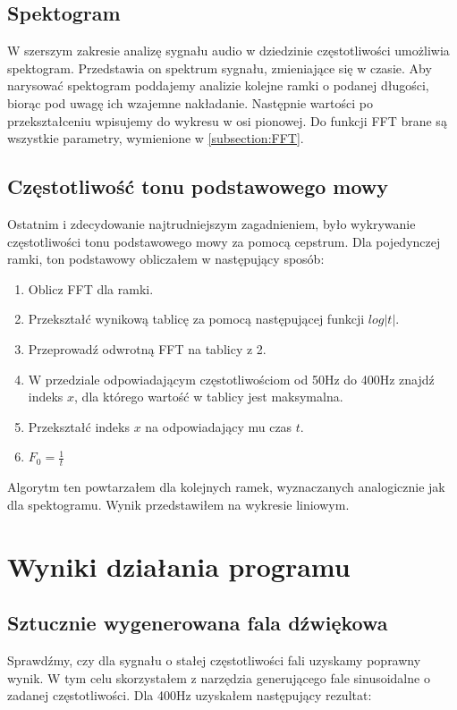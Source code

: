 \documentclass{article}
\begin{document}
\subsection{Spektogram}

W szerszym zakresie analizę sygnału audio w dziedzinie częstotliwości umożliwia spektogram. Przedstawia on spektrum sygnału, zmieniające się w czasie. Aby narysować spektogram poddajemy analizie kolejne ramki o podanej długości, biorąc pod uwagę ich wzajemne nakładanie. Następnie wartości po przekształceniu wpisujemy do wykresu w osi pionowej. Do funkcji FFT brane są wszystkie parametry, wymienione w \ref{subsection:FFT}.

\subsection{Częstotliwość tonu podstawowego mowy}

Ostatnim i zdecydowanie najtrudniejszym zagadnieniem, było wykrywanie częstotliwości tonu podstawowego mowy za pomocą cepstrum. Dla pojedynczej ramki, ton podstawowy obliczałem w następujący sposób:
\begin{enumerate}
\item Oblicz FFT dla ramki.
\item Przekształć wynikową tablicę za pomocą następującej funkcji $log|t|$.
\item Przeprowadź odwrotną FFT na tablicy z 2.
\item W przedziale odpowiadającym częstotliwościom od 50Hz do 400Hz znajdź indeks $x$, dla którego wartość w tablicy jest maksymalna.
\item Przekształć indeks $x$ na odpowiadający mu czas $t$.
\item $F_0 = \frac{1}{t}$
\end{enumerate}

Algorytm ten powtarzałem dla kolejnych ramek, wyznaczanych analogicznie jak dla spektogramu. Wynik przedstawiłem na wykresie liniowym.

\section{Wyniki działania programu}
\subsection{Sztucznie wygenerowana fala dźwiękowa}

Sprawdźmy, czy dla sygnału o stałej częstotliwości fali uzyskamy poprawny wynik. W tym celu skorzystałem z narzędzia generującego fale sinusoidalne o zadanej częstotliwości. Dla 400Hz uzyskałem następujący rezultat:
\end{document}
